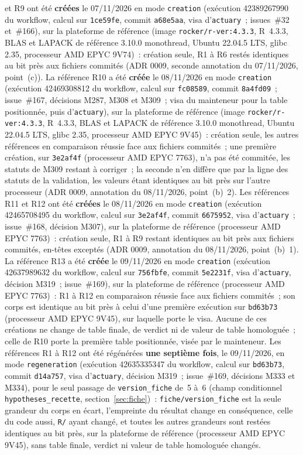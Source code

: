 \documentclass[a4paper,11pt]{article}
\newcommand{\code}[1]{\texttt{\small #1}}
\begin{document}
et R9 ont été \textbf{créées} le 07/11/2026 en mode \code{creation}
(exécution 42389267990 du workflow, calcul sur \code{1ce59fe}, commit
\code{a68e5aa}, visa d'\code{actuary}~; issues~\#32 et~\#166), sur la
plateforme de référence (image \code{rocker/r-ver:4.3.3}, R~4.3.3, BLAS et
LAPACK de référence 3.10.0 monothread, Ubuntu 22.04.5 LTS, glibc 2.35,
processeur AMD EPYC 9V74)~: création seule, R1 à R6 restés identiques au
bit près aux fichiers commités (ADR 0009, seconde annotation du 07/11/2026,
point~(c)). La référence R10 a été \textbf{créée} le 08/11/2026 en mode
\code{creation} (exécution 42469308812 du workflow, calcul sur
\code{fc08589}, commit \code{8a4fd09}~; issue~\#167, décisions M287, M308 et
M309~; visa du mainteneur pour la table positionnée, puis d'\code{actuary}),
sur la plateforme de référence (image \code{rocker/r-ver:4.3.3}, R~4.3.3,
BLAS et LAPACK de référence 3.10.0 monothread, Ubuntu 22.04.5 LTS, glibc
2.35, processeur AMD EPYC 9V45)~: création seule, les autres références
en comparaison réussie face aux fichiers commités~; une première
création, sur \code{3e2af4f} (processeur AMD EPYC 7763), n'a pas été
commitée, les statuts de M309 restant à corriger~; la seconde n'en diffère
que par la ligne des statuts de la validation, les valeurs étant
identiques au bit près sur l'autre processeur (ADR 0009, annotation du
08/11/2026, point~(b)~2). Les références R11 et R12 ont été
\textbf{créées} le 08/11/2026 en mode \code{creation} (exécution
42465708495 du workflow, calcul sur \code{3e2af4f}, commit \code{6675952},
visa d'\code{actuary}~; issue~\#168, décision M307), sur la plateforme de
référence (processeur AMD EPYC 7763)~: création seule, R1 à R9 restant
identiques au bit près aux fichiers commités, en-têtes exceptés (ADR 0009,
annotation du 08/11/2026, point~(b)~1). La référence R13 a été
\textbf{créée} le 09/11/2026 en mode \code{creation} (exécution
42637989632 du workflow, calcul sur \code{756fbfe}, commit
\code{5e2231f}, visa d'\code{actuary}, décision M319~; issue~\#169), sur
la plateforme de référence (processeur AMD EPYC 7763)~: R1 à R12 en
comparaison réussie face aux fichiers commités~; son corps est identique au
bit près à celui d'une première exécution sur \code{bd63b73} (processeur
AMD EPYC 9V45), sur laquelle porte le visa. Aucune de ces créations ne
change de table finale, de verdict ni de valeur de table homologuée~;
celle de R10 porte la première table positionnée, visée par le
mainteneur. Les références R1 à R12 ont été régénérées \textbf{une
septième fois}, le 09/11/2026, en mode \code{regeneration} (exécution
42635335347 du workflow, calcul sur \code{bd63b73}, commit
\code{d14a757}, visa d'\code{actuary}, décision M319~; issue~\#169,
décisions M333 et M334), pour le seul passage de \code{version\_fiche}
de~5 à~6 (champ conditionnel \code{hypotheses\_recette},
section~\ref{sec:fiche})~: \code{fiche/version\_fiche} est la seule
grandeur du corps en écart, l'empreinte du résultat change en
conséquence, celle du code aussi, \code{R/} ayant changé, et toutes les
autres grandeurs sont restées identiques au bit près, sur la plateforme de
référence (processeur AMD EPYC 9V45), sans table finale, verdict ni valeur
de table homologuée changés.
\end{document}
